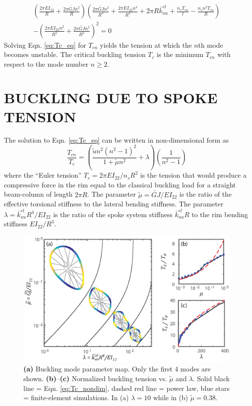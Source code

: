 \documentclass{bmd2016p}
\begin{document}
	\begin{multline}\label{eq:Tc_eq}
	\left(\frac{2\pi EI_{22}}{R}+\frac{2\pi \widetilde{GJ}n^2}{R} \right) \left( \frac{2\pi \widetilde{GJ}n^2}{R^3} + \frac{2\pi EI_{22}n^4}{R^3} + 2\pi R\bar{k}_{uu}^{el} + \frac{n_sT_{cn}}{l} - \frac{n_sn^2T_{cn}}{R}\right)\\
	- \left( \frac{2\pi EI_{22}n^2}{R^2} + \frac{2\pi \widetilde{GJ}n^2}{R^2} \right)^2 = 0
	\end{multline}
Solving Eqn. \ref{eq:Tc_eq} for $T_{cn}$ yields the tension at which the $n$th mode becomes unstable. The critical buckling tension $T_c$ is the minimum $T_{cn}$ with respect to the mode number $n\geq 2$.



\section{BUCKLING DUE TO SPOKE TENSION}
The solution to Eqn. \ref{eq:Tc_eq} can be written in non-dimensional form as
	\begin{equation}\label{eq:Tc_nondim}
	\frac{T_{cn}}{T_e} = \left( \frac{\tilde{u}n^2(n^2-1)^2}{1+\tilde{\mu}n^2} + \lambda \right) \left(\frac{1}{n^2-1} \right)
	\end{equation}
where the ``Euler tension'' $T_e=2\pi EI_{22}/n_sR^2$ is the tension that would produce a compressive force in the rim equal to the classical buckling load for a straight beam-column of length $2\pi R$. The parameter $\tilde{\mu} = \widetilde{GJ}/EI_{22}$ is the ratio of the effective torsional stiffness to the lateral bending stiffness. The parameter $\lambda = \bar{k}_{uu}^{el}R^4/EI_{22}$ is the ratio of the spoke system stiffness $\bar{k}_{uu}^{el}R$ to the rim bending stiffness $EI_{22}/R^3$.

\begin{figure}[!ht]
\centering
\includegraphics[scale=1.0]{figures/bmd_figures-04.eps}
\caption{\textbf{(a)} Buckling mode parameter map. Only the first 4 modes are shown. \textbf{(b)}--\textbf{(c)} Normalized buckling tension vs. $\tilde{\mu}$ and $\lambda$. Solid black line = Eqn. \ref{eq:Tc_nondim}, dashed red line = power law, blue stars = finite-element simulations. In (a) $\lambda=10$ while in (b) $\tilde{\mu} = 0.38$.}
\label{fig:Tc_nondim}
\end{figure}
\end{document}
